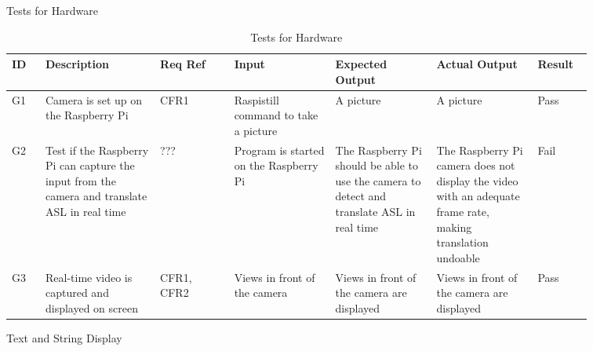 \documentclass[12pt, titlepage]{article}
\begin{document}
\newpage
\centerline{Tests for Hardware}

\renewcommand{\arraystretch}{1.2}
\noindent \begin{longtable}{p{0.05\linewidth}|p{0.17\linewidth}|p{0.11\linewidth}|p{0.15\linewidth}|p{0.15\linewidth}|p{0.15\linewidth}|p{0.08\linewidth}}
\hline
\textbf{ID} & \textbf{Description} & \textbf{Req Ref} & \textbf{Input} & \textbf{Expected Output} & \textbf{Actual Output} & \textbf{Result}\\
\hline
G1 & Camera is set up on the Raspberry Pi & CFR1 & Raspistill command to take a picture & A picture & A picture & Pass\\ \hline
G2 & Test if the Raspberry Pi can capture the input from the camera and translate ASL in real time & ??? & Program is started on the Raspberry Pi & The Raspberry Pi should be able to use the camera to detect and translate ASL in real time & The Raspberry Pi camera does not display the video with an adequate frame rate, making translation undoable & Fail\\ \hline
G3 & Real-time video is captured and displayed on screen & CFR1, CFR2 & Views in front of the camera & Views in front of the camera are displayed & Views in front of the camera are displayed & Pass
\hline
\caption{Tests for Hardware}
\end{longtable}

\newpage
\centerline{Text and String Display}
\end{document}
